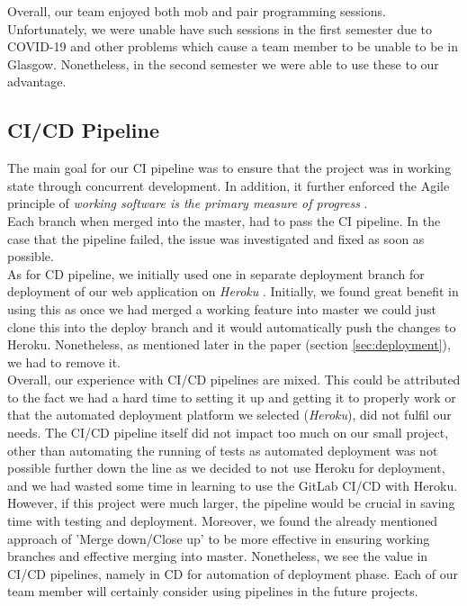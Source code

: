 \documentclass{l3proj}
\begin{document}
        Overall, our team enjoyed both mob and pair programming sessions. Unfortunately, we were unable have such sessions in the first semester due to COVID-19 and other problems which cause a team member to be unable to be in Glasgow. Nonetheless, in the second semester we were able to use these to our advantage. 
    \subsection{CI/CD Pipeline}
    \label{sec:cicd}
        The main goal for our CI pipeline was to ensure that the project was in working state through concurrent development. In addition, it further enforced the Agile principle of \textit{working software is the primary measure of progress} \cite{manifesto}.\\
        Each branch when merged into the master, had to pass the CI pipeline. In the case that the pipeline failed, the issue was investigated and fixed as soon as possible.\\
        As for CD pipeline, we initially used one in separate deployment branch for deployment of our web application on \textit{Heroku} \cite{heroku}. Initially, we found great benefit in using this as once we had merged a working feature into master we could just clone this into the deploy branch and it would automatically push the changes to Heroku. Nonetheless, as mentioned later in the paper (section \ref{sec:deployment}), we had to remove it.\\
        
        Overall, our experience with CI/CD pipelines are mixed. This could be attributed to the fact we had a hard time to setting it up and getting it to properly work or that the automated deployment platform we selected (\textit{Heroku}), did not fulfil our needs. The CI/CD pipeline itself did not impact too much on our small project, other than automating the running of tests as automated deployment was not possible further down the line as we decided to not use Heroku for deployment, and we had wasted some time in learning to use the GitLab CI/CD with Heroku. However, if this project were much larger, the pipeline would be crucial in saving time with testing and deployment. Moreover, we found the already mentioned approach of 'Merge down/Close up' \cite{merge} to be more effective in ensuring working branches and effective merging into master. Nonetheless, we see the value in CI/CD pipelines, namely in CD for automation of deployment phase. Each of our team member will certainly consider using pipelines in the future projects.
        
\end{document}
